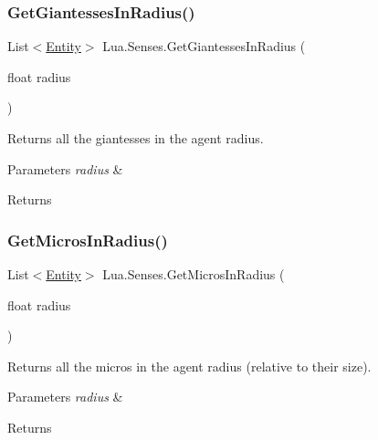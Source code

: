 \subsubsection{\texorpdfstring{GetGiantessesInRadius()}{GetGiantessesInRadius()}}
{\footnotesize\ttfamily List$<$\mbox{\hyperlink{class_lua_1_1_entity}{Entity}}$>$ Lua.\+Senses.\+Get\+Giantesses\+In\+Radius (\begin{DoxyParamCaption}\item[{float}]{radius }\end{DoxyParamCaption})}



Returns all the giantesses in the agent radius. 


\begin{DoxyParams}{Parameters}
{\em radius} & \\
\hline
\end{DoxyParams}
\begin{DoxyReturn}{Returns}

\end{DoxyReturn}
\mbox{\label{class_lua_1_1_senses_adc485743dc4551711e19323a0e93c4a5}} 
\subsubsection{\texorpdfstring{GetMicrosInRadius()}{GetMicrosInRadius()}}
{\footnotesize\ttfamily List$<$\mbox{\hyperlink{class_lua_1_1_entity}{Entity}}$>$ Lua.\+Senses.\+Get\+Micros\+In\+Radius (\begin{DoxyParamCaption}\item[{float}]{radius }\end{DoxyParamCaption})}



Returns all the micros in the agent radius (relative to their size). 


\begin{DoxyParams}{Parameters}
{\em radius} & \\
\hline
\end{DoxyParams}
\begin{DoxyReturn}{Returns}

\end{DoxyReturn}
\mbox{\label{class_lua_1_1_senses_a46bf9d49d69a4c9e8bc9c831e19c8a22}} 
